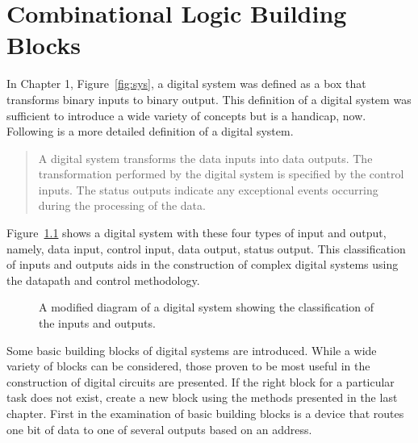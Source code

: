 \chapter{Combinational Logic Building Blocks}

In Chapter 1, Figure~\ref{fig:sys}, a digital system was defined 
as a box that transforms binary inputs to binary output.  This definition 
of a digital system was sufficient to introduce  a wide variety of 
concepts but is a handicap, now. Following is a more detailed 
definition of a digital system.
\begin{quote}  A digital system transforms the data inputs into 
data outputs.  The transformation performed by the digital system is 
specified by the control inputs.  The status outputs indicate any
exceptional events occurring during the processing of the data.
\end{quote}

Figure~\ref{fig:Asys} shows a digital system with these four types
of input and output, namely, data input, control input, data output, status output.
This classification of inputs and outputs aids in the
construction of complex digital systems using the datapath and
control methodology.

\begin{figure}[ht]
\caption{A modified diagram of a digital system showing the classification
of the inputs and outputs.}
\label{fig:Asys}
\end{figure}

Some basic building blocks of digital systems are introduced.  
While a wide variety of blocks can be considered, those
proven to be most useful in the construction 
of digital circuits are presented.  If the right block for a particular
task does not exist, create a new block using the methods presented 
in the last chapter.  First in the examination of basic building 
blocks is a device that routes one bit of data to one of several
outputs based on an address.

